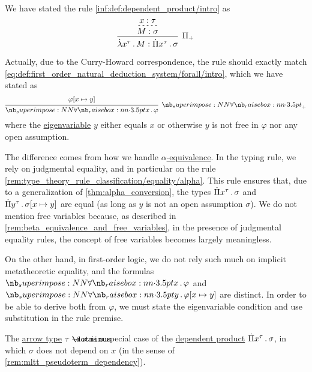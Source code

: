 \begin{remark}\label{rem:typing_rule_eigenvariables}
  We have stated the rule \ref{inf:def:dependent_product/intro} as
  \begin{equation*}
    \begin{prooftree}
      \hypo{ x: \tau }
      \infer[dashed]1{ M: \sigma }
      \infer1[\ensuremath{ \Pi_+ }]{ \qabs {x^\tau} M: \qprod {x^\tau} \sigma }
    \end{prooftree}
  \end{equation*}

  Actually, due to the Curry-Howard correspondence, the rule should exactly match \ref{eq:def:first_order_natural_deduction_system/forall/intro}, which we have stated as
  \begin{equation*}
    \begin{prooftree}
      \hypo{ \varphi[x \mapsto y] }
      \infer1[\ensuremath{ \synforall_+ }]{ \qpolytype x \varphi },
    \end{prooftree}
  \end{equation*}
  where the \hyperref[con:eigenvariable]{eigenvariable} \( y \) either equals \( x \) or otherwise \( y \) is not free in \( \varphi \) nor any open assumption.

  The difference comes from how we handle \hyperref[def:lambda_term_alpha_equivalence]{\( \alpha \)-equivalence}. In the typing rule, we rely on judgmental equality, and in particular on the rule \ref{rem:type_theory_rule_classification/equality/alpha}. This rule ensures that, due to a generalization of \cref{thm:alpha_conversion}, the types \( \qprod {x^\tau} \sigma \) and \( \qprod {y^\tau} \sigma[x \mapsto y] \) are equal (as long as \( y \) is not an open assumption \( \sigma \)). We do not mention free variables because, as described in \cref{rem:beta_equivalence_and_free_variables}, in the presence of judgmental equality rules, the concept of free variables becomes largely meaningless.

  On the other hand, in first-order logic, we do not rely such much on implicit metatheoretic equality, and the formulas \( \qpolytype x \varphi \) and \( \qpolytype y \varphi[x \mapsto y] \) are distinct. In order to be able to derive both from \( \varphi \), we must state the eigenvariable condition and use substitution in the rule premise.
\end{remark}

\begin{remark}\label{rem:arrow_type_via_dependent_product}
  The \hyperref[def:arrow_type]{arrow type} \( \tau \synimplies \sigma \) is a special case of the \hyperref[def:dependent_product]{dependent product} \( \qprod {x^\tau} \sigma \), in which \( \sigma \) does not depend on \( x \) (in the sense of \cref{rem:mltt_pseudoterm_dependency}).
\end{remark}


